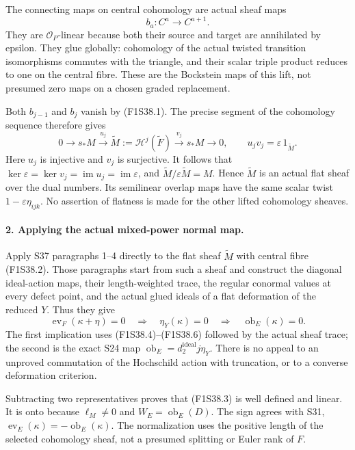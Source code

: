 The connecting maps on central cohomology are actual sheaf maps
\[
 b_a:C^a\longrightarrow C^{a+1}.
 \tag{F1S38.5}
\]
They are $\mathcal O_P$-linear because both their source and target
are annihilated by epsilon. They glue globally: cohomology of
the actual twisted transition isomorphisms commutes with the
triangle, and their scalar triple product reduces to one on
the central fibre. These are the Bockstein maps of this lift,
not presumed zero maps on a chosen graded replacement.

Both $b_{j-1}$ and $b_j$ vanish by (F1S38.1).
The precise segment of the cohomology sequence therefore gives
\[
 0\longrightarrow s_*M\xrightarrow{u_j}
       \widetilde M:=\mathcal H^j(\widetilde F)
         \xrightarrow{v_j}s_*M\longrightarrow0,
 \qquad u_jv_j=\varepsilon\,1_{\widetilde M}.
 \tag{F1S38.6}
\]
Here $u_j$ is injective and $v_j$ is surjective. It follows that
$\ker\varepsilon=\ker v_j=\operatorname{im}u_j
=\operatorname{im}\varepsilon$, and
$\widetilde M/\varepsilon\widetilde M=M$.
Hence $\widetilde M$ is an actual flat sheaf over the dual
numbers. Its semilinear overlap maps have the same scalar twist
$1-\varepsilon\eta_{ijk}$. No assertion of flatness is made for
the other lifted cohomology sheaves.

\paragraph{2. Applying the actual mixed-power normal map.}
Apply S37 paragraphs 1--4 directly to the flat sheaf
$\widetilde M$ with central fibre (F1S38.2).
Those paragraphs start from such a sheaf and construct the
diagonal ideal-action maps, their length-weighted trace, the
regular conormal values at every defect point, and the actual
glued ideals of a flat deformation of the reduced $Y$.
Thus they give
\[
 \operatorname{ev}_F(\kappa+\eta)=0
       \quad\Longrightarrow\quad
       \eta_Y(\kappa)=0
       \quad\Longrightarrow\quad
       \operatorname{ob}_E(\kappa)=0.
 \tag{F1S38.7}
\]
The first implication uses (F1S38.4)--(F1S38.6) followed by the
actual sheaf trace; the second is the exact S24 map
$\operatorname{ob}_E=d_2^{\mathrm{ideal}}j\eta_Y$.
There is no appeal to an unproved commutation of the Hochschild
action with truncation, or to a converse deformation criterion.

Subtracting two representatives proves that (F1S38.3) is
well defined and linear. It is onto because $\ell_M\ne0$ and
$W_E=\operatorname{ob}_E(D)$. The sign agrees with S31,
$\operatorname{ev}_E(\kappa)=-\operatorname{ob}_E(\kappa)$.
The normalization uses the positive length of the selected
cohomology sheaf, not a presumed splitting or Euler rank of $F$.

